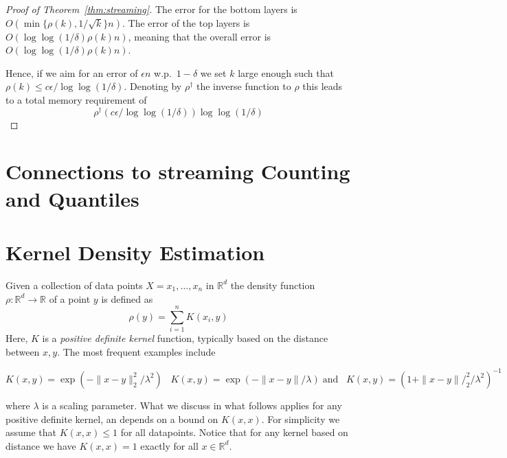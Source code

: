 \documentclass{article} %
\newcommand{\R}{\mathbb{R}}
\newcommand{\eps}{\epsilon}
\begin{document}
\begin{proof} [Proof of Theorem~\ref{thm:streaming}]
The error for the bottom layers is $O(\min\{\rho(k), 1/\sqrt{k}\} n)$. The error of the top layers is $O(\log\log(1/\delta) \rho(k) n)$, meaning that the overall error is $O(\log\log(1/\delta) \rho(k) n)$.

Hence, if we aim for an error of $\eps n$ w.p.\ $1-\delta$ we set $k$ large enough such that $\rho(k) \leq c \eps / \log\log(1/\delta)$. Denoting by $\rho^{\dagger}$ the inverse function to $\rho$ this leads to a total memory requirement of 
$$ \rho^{\dagger}(c \eps / \log\log(1/\delta)) \log\log(1/\delta) $$

\end{proof}




\section{Connections to streaming Counting and Quantiles}






\section{Kernel Density Estimation}

Given a collection of data points $X = x_1,\ldots, x_n$ in $\R^d$ the density function $\rho: \R^d \rightarrow \R$ of a point $y$ is defined as 
$$ \rho(y) = \sum_{i=1}^{n} K(x_i,y) $$
Here, $K$ is a \emph{positive definite kernel} function, typically based on the distance between $x,y$. The most frequent examples include

$$ K(x,y) = \exp(- \|x-y\|_2^2/\lambda^2)\;\;\; K(x,y) = \exp(- \|x-y\|/\lambda) \; \mbox{and}\;\;\; K(x,y) = (1+\|x-y\|/_2^2/\lambda^2)^{-1}$$

where $\lambda$ is a scaling parameter. What we discuss in what follows applies for any positive definite kernel, an depends on a bound on $K(x,x)$. For simplicity we assume that $K(x,x) \leq 1$ for all datapoints. Notice that for any kernel based on distance we have $K(x,x)=1$ exactly for all $x \in \R^d$.
\end{document}
